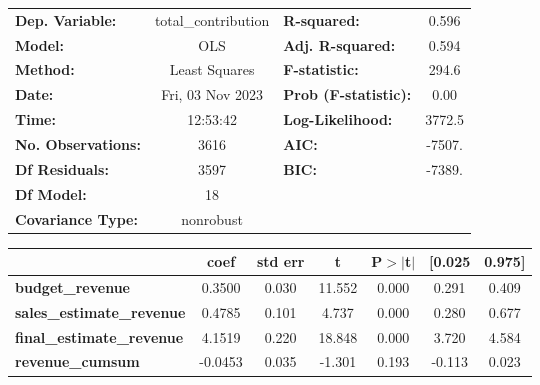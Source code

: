 \begin{center}
\begin{tabular}{lclc}
\toprule
\textbf{Dep. Variable:}                     & total\_contribution & \textbf{  R-squared:         } &     0.596   \\
\textbf{Model:}                             &         OLS         & \textbf{  Adj. R-squared:    } &     0.594   \\
\textbf{Method:}                            &    Least Squares    & \textbf{  F-statistic:       } &     294.6   \\
\textbf{Date:}                              &   Fri, 03 Nov 2023  & \textbf{  Prob (F-statistic):} &     0.00    \\
\textbf{Time:}                              &       12:53:42      & \textbf{  Log-Likelihood:    } &    3772.5   \\
\textbf{No. Observations:}                  &          3616       & \textbf{  AIC:               } &    -7507.   \\
\textbf{Df Residuals:}                      &          3597       & \textbf{  BIC:               } &    -7389.   \\
\textbf{Df Model:}                          &            18       & \textbf{                     } &             \\
\textbf{Covariance Type:}                   &      nonrobust      & \textbf{                     } &             \\
\bottomrule
\end{tabular}
\begin{tabular}{lcccccc}
                                            & \textbf{coef} & \textbf{std err} & \textbf{t} & \textbf{P$> |$t$|$} & \textbf{[0.025} & \textbf{0.975]}  \\
\midrule
\textbf{budget\_revenue}                    &       0.3500  &        0.030     &    11.552  &         0.000        &        0.291    &        0.409     \\
\textbf{sales\_estimate\_revenue}           &       0.4785  &        0.101     &     4.737  &         0.000        &        0.280    &        0.677     \\
\textbf{final\_estimate\_revenue}           &       4.1519  &        0.220     &    18.848  &         0.000        &        3.720    &        4.584     \\
\textbf{revenue\_cumsum}                    &      -0.0453  &        0.035     &    -1.301  &         0.193        &       -0.113    &        0.023     \\

\end{tabular}
\end{center}

